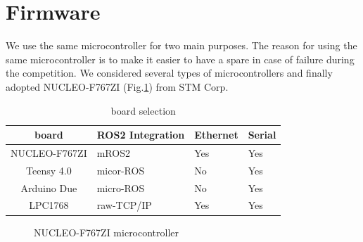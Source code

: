 \documentclass[lettersize,journal]{IEEEtran}
\begin{document}
\section{Firmware}
We use the same microcontroller for two main purposes.
The reason for using the same microcontroller is to make it easier to have a spare in case of failure during the competition.
We considered several types of microcontrollers and finally adopted NUCLEO-F767ZI (Fig.\ref{fig:f767zi}) from STM Corp.

\begin{table}[H]
    \caption{board selection}
    \label{table:board_selection}
    \centering
     \begin{tabular}{clll}
      \hline
      board & ROS2 Integration & Ethernet & Serial \\
      \hline \hline
      NUCLEO-F767ZI & mROS2 & Yes & Yes \\
      Teensy 4.0 & micor-ROS & No & Yes \\
      Arduino Due & micro-ROS & No & Yes \\
      LPC1768 & raw-TCP/IP & Yes & Yes \\
      \hline
     \end{tabular}
\end{table}

\begin{figure}[H]
    \begin{center}
  \end{center}
  \caption{NUCLEO-F767ZI microcontroller}
  \label{fig:f767zi}
\end{figure}
\end{document}
